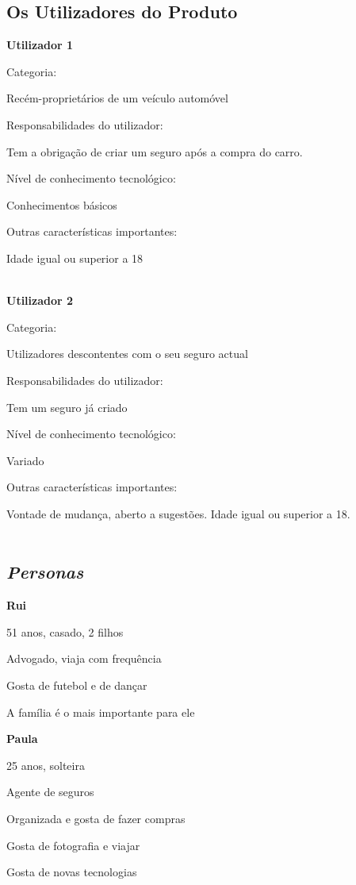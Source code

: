 \subsection{Os Utilizadores do Produto}
\begin{description}
\item \textbf{Utilizador 1}
\item Categoria: 

Recém-proprietários de um veículo automóvel
\item Responsabilidades do utilizador: 

Tem a obrigação de criar um seguro após a compra do carro.
\item Nível de conhecimento tecnológico: 

Conhecimentos básicos
\item Outras características importantes:

Idade igual ou superior a 18\\\\
\end{description}
\begin{description}
\item \textbf{Utilizador 2}
\item Categoria: 

Utilizadores descontentes com o seu seguro actual
\item Responsabilidades do utilizador: 

Tem um seguro já criado
\item Nível de conhecimento tecnológico: 

Variado
\item Outras características importantes: 

Vontade de mudança, aberto a sugestões. Idade igual ou superior a 18.\\\\
\end{description}

\subsection{\emph{Personas}}
\begin{description}
\item \textbf{Rui}

51 anos, casado, 2 filhos

Advogado, viaja com frequência

Gosta de futebol e de dançar

A família é o mais importante para ele

\item \textbf{Paula}

25 anos, solteira

Agente de seguros

Organizada e gosta de fazer compras

Gosta de fotografia e viajar

Gosta de novas tecnologias

\end{description}
\pagebreak
